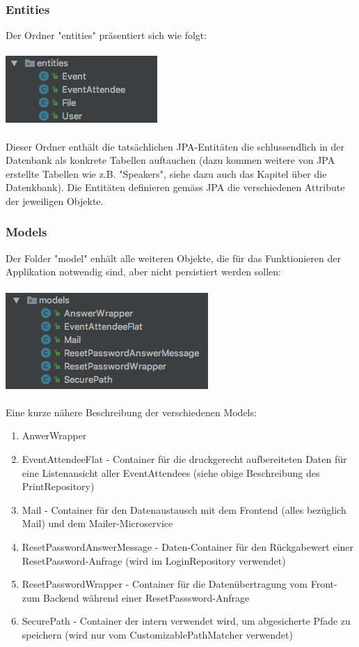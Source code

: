 \documentclass[11pt]{article} %
\begin{document}
\subsubsection{Entities}
Der Ordner "entities" präsentiert sich wie folgt:
\\
\\
\includegraphics[scale=0.7]{structure_eventmanagement_entities}
\\
\\
Dieser Ordner enthält die tatsächlichen JPA-Entitäten die schlussendlich in der Datenbank als konkrete Tabellen auftauchen (dazu kommen weitere von JPA erstellte Tabellen wie z.B. "Speakers", siehe dazu auch das Kapitel über die Datenkbank). Die Entitäten definieren gemäss JPA die verschiedenen Attribute der jeweiligen Objekte.
\subsubsection{Models}
Der Folder "model" enhält alle weiteren Objekte, die für das Funktionieren der Applikation notwendig sind, aber nicht persistiert werden sollen:
\\
\\
\includegraphics[scale=0.7]{structure_eventmanagement_models}
\\
\\
Eine kurze nähere Beschreibung der verschiedenen Models:
\begin{enumerate}
\item AnwerWrapper
\item EventAttendeeFlat - Container für die druckgerecht aufbereiteten Daten für eine Listenansicht aller EventAttendees (siehe obige Beschreibung des PrintRepository)
\item Mail - Container für den Datenaustausch mit dem Frontend (alles bezüglich Mail) und dem Mailer-Microservice
\item ResetPasswordAnswerMessage - Daten-Container für den Rückgabewert einer ResetPassword-Anfrage (wird im LoginRepository verwendet)
\item ResetPasswordWrapper - Container für die Datenübertragung vom Front- zum Backend während einer ResetPasssword-Anfrage
\item SecurePath - Container der intern verwendet wird, um abgesicherte Pfade zu speichern (wird nur vom CustomizablePathMatcher verwendet)
\end{enumerate}
\end{document}
